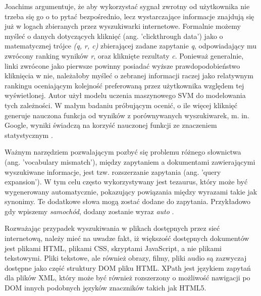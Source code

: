 Joachims argumentuje, że aby wykorzystać sygnał zwrotny
od użytkownika nie trzeba się go o to pytać bezpośrednio, lecz wystarczające informacje znajdują się
już w logach zbieranych przez wyszukiwarki internetowe. Formalnie możemy myśleć o danych
dotyczących kliknięć (ang. 'clickthrough data') jako o matematycznej trójce {\it (q, r, c)} zbierającej zadane
zapytanie {\it q}, odpowiadający mu zwrócony ranking wyników {\it r}, oraz kliknięte rezultaty {\it c}. Ponieważ
generalnie, linki zwrócone jako pierwsze powinny posiadać wyższe prawdopodobieństwo kliknięcia w
nie, należałoby myśleć o zebranej informacji raczej jako relatywnym rankingu oceniającym kolejność
preferowaną przez użytkownika względem tej wyświetlonej. Autor użył modelu uczenia maszynowego
SVM do modelowania tych zależności. W małym badaniu próbującym ocenić, o ile więcej kliknięć
generuje nauczona funkcja od wyników z porównywanych wyszukiwarek, m. in. Google, wyniki
świadczą na korzyść nauczonej funkcji ze znaczeniem statystycznym \autocite{joachimsclickthroughdata}.\newline

Ważnym narzędziem pozwalającym pozbyć się problemu różnego słownictwa (ang.
'vocabulary mismatch'), między zapytaniem a dokumentami zawierającymi wyszukiwane informacje,
jest tzw. rozszerzanie zapytania (ang. 'query expansion'). W tym celu często wykorzystywany jest
tezaurus, który może być wygenerowany automatycznie, pokazujący powiązania między wyrazami takie jak synonimy. Te dodatkowe słowa mogą zostać dodane do zapytania. Przykładowo gdy
wpiszemy {\it samochód}, dodany zostanie wyraz {\it auto} \autocite{introtoinformationretrieval}.\newline

Rozważając przypadek wyszukiwania w plikach dostępnych przez sieć internetową, należy
mieć na uwadze fakt, iż większość dostępnych dokumentów jest plikami HTML, plikami CSS, skryptami
JavaScript, a nie plikami tekstowymi. Pliki tekstowe, ale również obrazy, filmy, pliki audio są zazwyczaj
dostępne jako część struktury DOM pliku HTML. XPath jest językiem zapytań dla plików XML, który
może być również rozszerzony o możliwość nawigacji po DOM innych podobnych języków znaczników takich jak HTML5. \newline

